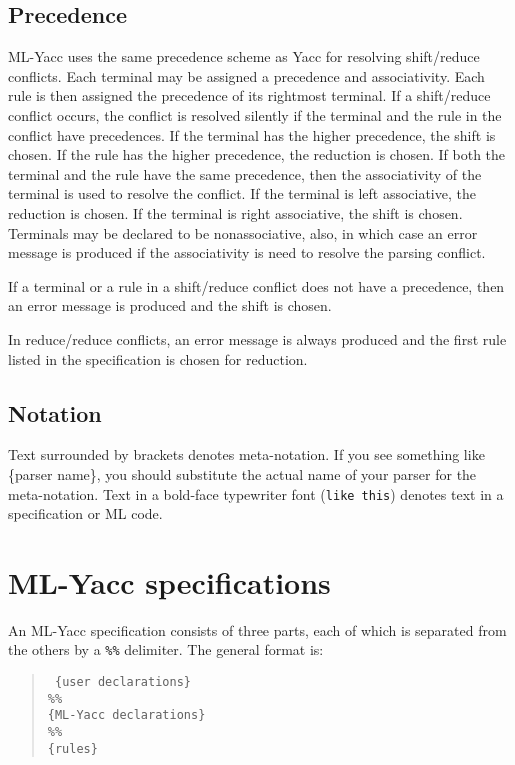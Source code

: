 \documentclass{article}
\begin{document}
\subsection{Precedence}
ML-Yacc uses the same precedence scheme as Yacc for resolving
shift/reduce conflicts.  Each terminal may be assigned a precedence and
associativity.  Each rule is then assigned the precedence of its rightmost
terminal.  If a shift/reduce conflict occurs, the conflict is resolved
silently if the terminal and the rule in the conflict have
precedences.
If the terminal has the higher precedence, the shift is chosen.  If
the rule has the higher precedence, the reduction is chosen.  If both
the terminal and the rule have the same precedence, then the associativity
of the terminal is used to resolve the conflict.  If the terminal is
left associative, the reduction is chosen.  If the terminal is 
right associative, the shift is chosen.   Terminals may be declared to 
be nonassociative, also, in which case an error message is produced
if the associativity is need to resolve the parsing conflict.

If a terminal or a rule in a shift/reduce conflict does not have
a precedence, then an error message is produced and the shift
is chosen.

In reduce/reduce conflicts, an error message is always produced and
the first rule listed in the specification is chosen for reduction.
\subsection{Notation}

Text surrounded by brackets denotes meta-notation.  If you see
something like \{parser name\}, you should substitute the actual
name of your parser for the meta-notation.  Text in a bold-face
typewriter font ({\tt like this}) denotes text in a specification 
or ML code.

\section{ML-Yacc specifications}

An ML-Yacc specification consists of three parts, each of which is
separated from the others by a {\tt \%\%} delimiter.  The general format is:
\begin{quote}
\tt
        \{user declarations\} \\
        \%\% \\
        \{ML-Yacc declarations\} \\
        \%\% \\
        \{rules\}
\end{quote}
\end{document}
